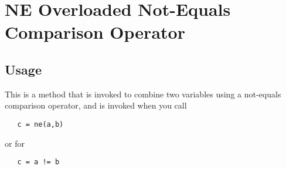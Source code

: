 \section{NE Overloaded Not-Equals Comparison Operator}

\subsection{Usage}

This is a method that is invoked to combine two variables using a
not-equals comparison operator, and is invoked when you call
\begin{verbatim}
   c = ne(a,b)
\end{verbatim}
or for 
\begin{verbatim}
   c = a != b
\end{verbatim}
